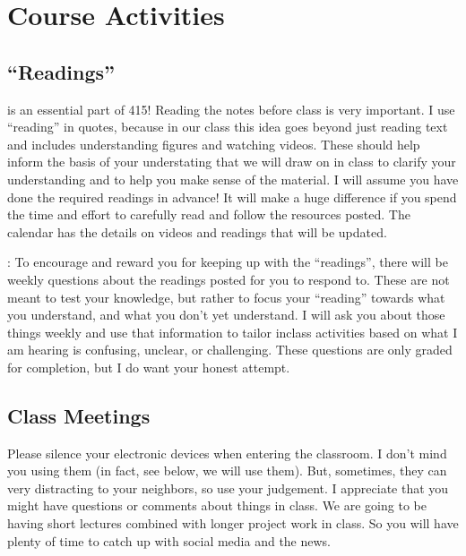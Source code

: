 \documentclass[letterpaper,10pt,english]{jupyterBook}
\begin{document}
\section{Course Activities}
\label{\detokenize{content/0_course/2_design:course-activities}}

\subsection{“Readings”}
\label{\detokenize{content/0_course/2_design:readings}}
\sphinxAtStartPar
{} is an essential part of 415! Reading the notes before class is very important. I use “reading” in quotes, because in our class this idea goes beyond just reading text and includes understanding figures and watching videos. These should help inform the basis of your understating that we will draw on in class to clarify your understanding and to help you make sense of the material. I will assume you have done the required readings in advance! It will make a huge difference if you spend the time and effort to carefully read and follow the resources posted. The calendar has the details on videos and readings that will be updated.

\sphinxAtStartPar
{}: To encourage and reward you for keeping up with the “readings”, there will be weekly questions about the readings posted for you to respond to. These are not meant to test your knowledge, but rather to focus your “reading” towards what you understand, and what you don’t yet understand. I will ask you about those things weekly and use that information to tailor in\sphinxhyphen{}class activities based on what I am hearing is confusing, unclear, or challenging. These questions are only graded for completion, but I do want your honest attempt.


\subsection{Class Meetings}
\label{\detokenize{content/0_course/2_design:class-meetings}}
\sphinxAtStartPar
{} Please silence your electronic devices when entering the classroom. I don’t mind you using them (in fact, see below, we will use them). But, sometimes, they can very distracting to your neighbors, so use your judgement. I appreciate that you might have questions or comments about things in class. We are going to be having short lectures combined with longer project work in class. So you will have plenty of time to catch up with social media and the news.
\end{document}
